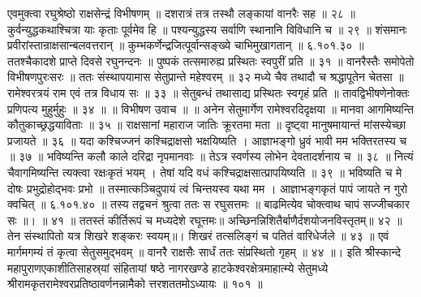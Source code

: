 एवमुक्त्वा रघुश्रेष्ठो राक्षसेन्द्रं विभीषणम् ॥
दशरात्रं तत्र तस्थौ लङ्कायां वानरैः सह ॥ २८ ॥
कुर्वन्युद्धकथाश्चित्रा याः कृताः पूर्वमेव हि ॥
पश्यन्युद्धस्य सर्वाणि स्थानानि विविधानि च ॥ २९ ॥
शंसमानः प्रवीरांस्तान्राक्षसान्बलवत्तरान् ॥
कुम्भकर्णेन्द्रजित्पूर्वान्सङ्ख्ये चाभिमुखागतान् ॥ ६.१०१.३० ॥
ततश्चैकादशे प्राप्ते दिवसे रघुनन्दनः ॥
पुष्पकं तत्समारुह्य प्रस्थितः स्वपुरीं प्रति ॥ ३१ ॥
वानरैस्तैः समोपेतो विभीषणपुरःसरः ॥
ततः संस्थापयामास सेतुप्रान्ते महेश्वरम् ॥ ३२
मध्ये चैव तथादौ च श्रद्धापूतेन चेतसा ॥
रामेश्वरत्रयं राम एवं तत्र विधाय सः ॥ ३३ ॥
सेतुबन्धं तथासाद्य प्रस्थितः स्वगृहं प्रति ॥
तावद्विभीषणेनोक्तः प्रणिपत्य मुहुर्मुहुः ॥ ३४ ॥
॥ विभीषण उवाच ॥ ॥
अनेन सेतुमार्गेण रामेश्वरदिदृक्षया ॥
मानवा आगमिष्यन्ति कौतुकाच्छ्रद्धयाविताः ॥ ३५ ॥
राक्षसानां महाराज जातिः क्रूरतमा मता ॥
दृष्ट्वा मानुषमायान्तं मांसस्येच्छा प्रजायते ॥ ३६ ॥
यदा कश्चिज्जनं कश्चिद्राक्षसो भक्षयिष्यति ।
आज्ञाभङ्गो ध्रुवं भावी मम भक्तिरतस्य च ॥ ३७ ॥
भविष्यन्ति कलौ काले दरिद्रा नृपमानवाः ॥
तेऽत्र स्वर्णस्य लोभेन देवतादर्शनाय च ॥ ३८ ॥
नित्यं चैवागमिष्यन्ति त्यक्त्वा रक्षःकृतं भयम् ।
तेषां यदि वधं कश्चिद्राक्षसात्प्रापयिष्यति ॥ ३९ ॥
भविष्यति च मे दोषः प्रभुद्रोहोद्भवः प्रभो ॥
तस्मात्कञ्चिदुपायं त्वं चिन्तयस्व यथा मम ।
आज्ञाभङ्गकृतं पापं जायते न गुरो क्वचित् ॥ ६.१०१.४० ॥
तस्य तद्वचनं श्रुत्वा ततः स रघुसत्तमः ॥
बाढमित्येव चोक्त्वाथ चापं सज्जीचकार सः ॥। ॥ ४१ ॥
ततस्तं कीर्तिरूपं च मध्यदेशे रघूत्तमः॥
अच्छिनन्निशितैर्बाणैर्दशयोजनविस्तृतम्॥ ४२ ॥
तेन संस्थापितो यत्र शिखरे शङ्करः स्वयम्॥।
शिखरं तत्सलिङ्गं च पतितं वारिधेर्जले ॥ ४३ ॥
एवं मार्गमगम्यं तं कृत्वा सेतुसमुद्भवम् ॥
वानरै राक्षसैः सार्धं ततः संप्रस्थितो गृहम् ॥ ४४ ॥।
इति श्रीस्कान्दे महापुराणएकाशीतिसाहस्र्यां संहितायां षष्ठे नागरखण्डे हाटकेश्वरक्षेत्रमाहात्म्ये सेतुमध्ये श्रीरामकृतरामेश्वरप्रतिष्ठावर्णनन्नामैको त्तरशततमोऽध्यायः ॥ १०१ ॥

